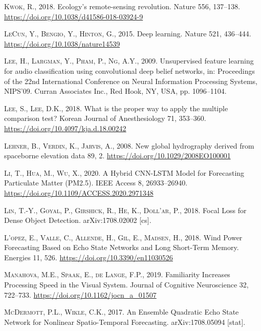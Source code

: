 \documentclass[a4paper,11pt]{article}
\begin{document}
\leavevmode\hypertarget{ref-kwok2018}{}%
\textsc{Kwok, R.}, 2018. Ecology's remote-sensing revolution. Nature 556, 137--138. \url{https://doi.org/10.1038/d41586-018-03924-9}

\leavevmode\hypertarget{ref-lecun2015}{}%
\textsc{LeCun, Y., Bengio, Y., Hinton, G.}, 2015. Deep learning. Nature 521, 436--444. \url{https://doi.org/10.1038/nature14539}

\leavevmode\hypertarget{ref-lee2009}{}%
\textsc{Lee, H., Largman, Y., Pham, P., Ng, A.Y.}, 2009. Unsupervised feature learning for audio classification using convolutional deep belief networks, in: Proceedings of the 22nd International Conference on Neural Information Processing Systems, NIPS'09. Curran Associates Inc., Red Hook, NY, USA, pp. 1096--1104.

\leavevmode\hypertarget{ref-lee2018}{}%
\textsc{Lee, S., Lee, D.K.}, 2018. What is the proper way to apply the multiple comparison test? Korean Journal of Anesthesiology 71, 353--360. \url{https://doi.org/10.4097/kja.d.18.00242}

\leavevmode\hypertarget{ref-lehner2008}{}%
\textsc{Lehner, B., Verdin, K., Jarvis, A.}, 2008. New global hydrography derived from spaceborne elevation data 89, 2. \url{https://doi.org/10.1029/2008EO100001}

\leavevmode\hypertarget{ref-li2020}{}%
\textsc{Li, T., Hua, M., Wu, X.}, 2020. A Hybrid CNN-LSTM Model for Forecasting Particulate Matter (PM2.5). IEEE Access 8, 26933--26940. \url{https://doi.org/10.1109/ACCESS.2020.2971348}

\leavevmode\hypertarget{ref-lin2018}{}%
\textsc{Lin, T.-Y., Goyal, P., Girshick, R., He, K., Doll\a'ar, P.}, 2018. Focal Loss for Dense Object Detection. arXiv:1708.02002 {[}cs{]}.

\leavevmode\hypertarget{ref-lopez2018}{}%
\textsc{L\a'opez, E., Valle, C., Allende, H., Gil, E., Madsen, H.}, 2018. Wind Power Forecasting Based on Echo State Networks and Long Short-Term Memory. Energies 11, 526. \url{https://doi.org/10.3390/en11030526}

\leavevmode\hypertarget{ref-manahova2019}{}%
\textsc{Manahova, M.E., Spaak, E., de Lange, F.P.}, 2019. Familiarity Increases Processing Speed in the Visual System. Journal of Cognitive Neuroscience 32, 722--733. \url{https://doi.org/10.1162/jocn_a_01507}

\leavevmode\hypertarget{ref-mcdermott2017}{}%
\textsc{McDermott, P.L., Wikle, C.K.}, 2017. An Ensemble Quadratic Echo State Network for Nonlinear Spatio-Temporal Forecasting. arXiv:1708.05094 {[}stat{]}.
\end{document}
